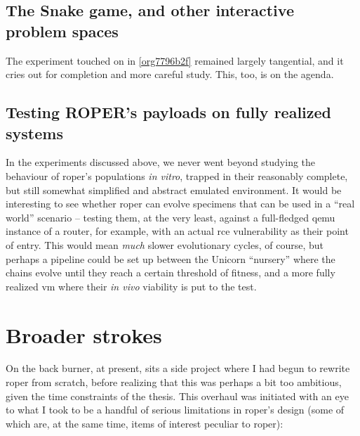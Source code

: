 \documentclass[12pt,glossary]{dalthesis}
\begin{document}
\subsection{The Snake game, and other interactive problem spaces}
\label{sec:org19b38e5}

The experiment touched on in \ref{org7796b2f} remained largely tangential,
and it cries out for completion and more careful study. This, too, is on the agenda. 

\subsection{Testing ROPER's payloads on fully realized systems}
\label{sec:org013bd5f}

In the experiments discussed above, we never went beyond studying the behaviour
of \gls{roper}'s populations \emph{in vitro}, trapped in their reasonably complete, but
still somewhat simplified and abstract emulated environment. It would be interesting
to see whether \gls{roper} can evolve specimens that can be used in a ``real world''
scenario -- testing them, at the very least, against a full-fledged \gls{qemu} instance
of a router, for example, with an actual \gls{rce} vulnerability as their point of
entry. This would mean \emph{much} slower evolutionary cycles, of course, but perhaps
a pipeline could be set up between the Unicorn ``nursery'' where the chains evolve 
until they reach a certain threshold of fitness, and a more fully realized \gls{vm}
where their \emph{in vivo} viability is put to the test. 


\section{Broader strokes}
\label{sec:org3b09360}

On the back burner, at present, sits a side project where I had begun to rewrite
\gls{roper} from scratch, before realizing that this was perhaps a bit too
ambitious, given the time constraints of the thesis. This overhaul was initiated
with an eye to what I took to be a handful of serious limitations in \gls{roper}'s
design (some of which are, at the same time, items of interest peculiar to \gls{roper}):
\end{document}
